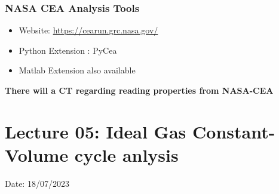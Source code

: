 \documentclass{article}
\begin{document}
	\subsubsection*{NASA CEA Analysis Tools}
	\begin{itemize}
		\item Website: \href{https://cearun.grc.nasa.gov/}{https://cearun.grc.nasa.gov/} 
		\item Python Extension : PyCea 
		\item Matlab Extension also available 
	\end{itemize}
	\textbf{There will a CT regarding reading properties from NASA-CEA }

	\vspace*{1cm}
	\section{Lecture 05: Ideal Gas Constant-Volume cycle anlysis} 
	\hfill Date: 18/07/2023
\end{document}
